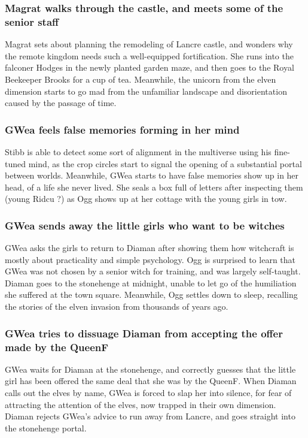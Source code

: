 \subsubsection{\Gls{Magrat} walks through the castle, and meets some of the senior staff}
\Gls{Magrat} sets about planning the remodeling of Lancre castle, and wonders why the remote
kingdom needs such a well-equipped fortification. She runs into the falconer \Gls{Hodges} in the
newly planted garden maze, and then goes to the Royal Beekeeper \Gls{Brooks} for a cup of tea.
Meanwhile, the unicorn from the elven dimension starts to go mad from the unfamiliar landscape and
disorientation caused by the passage of time.

\subsubsection{\Gls{GWea} feels false memories forming in her mind}
\Gls{Stibb} is able to detect some sort of alignment in the multiverse using his fine-tuned mind,
as the crop circles start to signal the opening of a substantial portal between worlds. Meanwhile,
\Gls{GWea} starts to have false memories show up in her head, of a life she never lived. She seals
a box full of letters after inspecting them (young \Gls{Ridcu} ?) as \Gls{Ogg} shows up at her
cottage with the young girls in tow.

\subsubsection{\Gls{GWea} sends away the little girls who want to be witches}
\Gls{GWea} asks the girls to return to \Gls{Diaman} after showing them how witchcraft is mostly
about practicality and simple psychology. \Gls{Ogg} is surprised to learn that \Gls{GWea} was not
chosen by a senior witch for training, and was largely self-taught. \Gls{Diaman} goes to the
stonehenge at midnight, unable to let go of the humiliation she suffered at the town square.
Meanwhile, \Gls{Ogg} settles down to sleep, recalling the stories of the elven invasion from
thousands of years ago.

\subsubsection{\Gls{GWea} tries to dissuage \Gls{Diaman} from accepting the offer made by the
    \Gls{QueenF}}
\Gls{GWea} waits for \Gls{Diaman} at the stonehenge, and correctly guesses that the little girl has
been offered the same deal that she was by the \Gls{QueenF}. When \Gls{Diaman} calls out the elves
by name, \Gls{GWea} is forced to slap her into silence, for fear of attracting the attention of the
elves, now trapped in their own dimension. \Gls{Diaman} rejects \Gls{GWea}'s advice to run away
from Lancre, and goes straight into the stonehenge portal.


